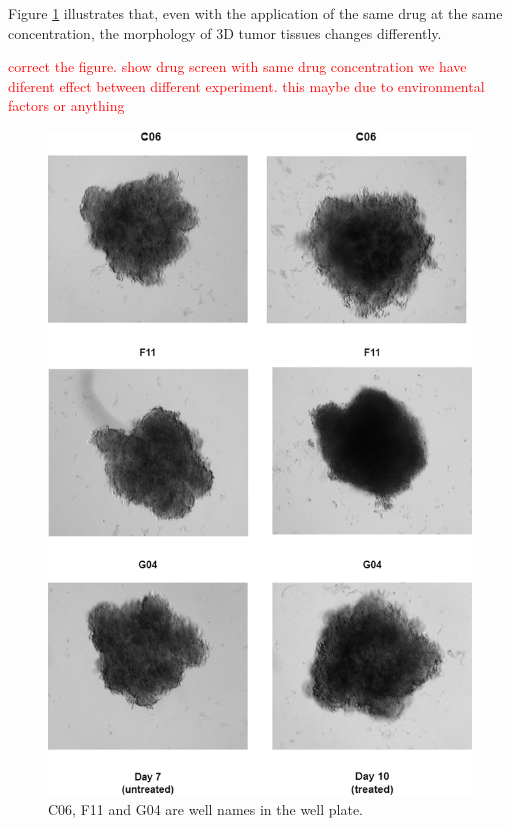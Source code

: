 Figure \ref{fig:Transition} illustrates that, even with the application of the same drug at the same concentration, the morphology of 3D tumor tissues changes differently.

\textcolor{red}{correct the figure. show drug screen with same drug concentration we have diferent effect between different experiment. this maybe due to environmental 
factors or anything}

\begin{figure}[H]
  \centering
  \includegraphics[scale=0.46]{figures/transition.png} 
  \caption{C06, F11 and G04 are well names in the well plate.}
  \label{fig:Transition}
\end{figure}



